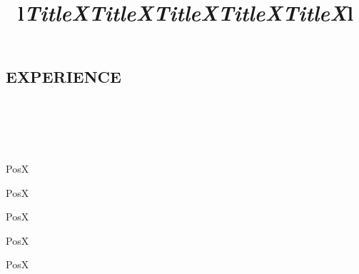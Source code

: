\documentclass[margin]{res}
\newcommand{\tb}{\textbullet \xspace}
\begin{document}
\begin{resume}
\section{EXPERIENCE}
\begin{format}
\\
\title{l}\\
\body\\
\end{format}

\title{\textit{TitleX}}
\begin{position}
\tb PosX
\end{position}

\title{\textit{TitleX}}
\begin{position}
\tb PosX
\end{position}

\title{\textit{TitleX}}
\begin{position}
\tb PosX
\end{position}

\title{\textit{TitleX}}
\begin{position}
\tb PosX
\end{position}

\title{\textit{TitleX}}
\begin{position}
\tb PosX
\end{position}


\begin{format}
\title{l}\\
\body\\
\end{format}


\end{resume}
\end{document}
